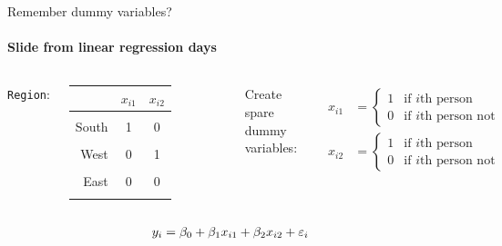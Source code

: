 \documentclass[aspectratio=169,dvipsnames]{beamer}
\newcommand{\InstructorNotes}[1]{\textit{\color{orange}#1}}
\renewcommand{\InstructorNotes}[1]{}
\begin{document}
\begin{frame}[c]{Remember dummy variables?}
\framesubtitle{Slide from linear regression days}

	\begin{columns}
	\centering
	\texttt{Region}:
	
	\qquad
	
	\begin{tabular}{r|cc}
		 & $x_{i1}$ & $x_{i2}$ \\ \hline
		 & \\
		South & {1 } & {0} \\
		\\
		West & {0 } & {1}\\
		\\
		East& {0 } & {0}\\
		&
	\end{tabular}
	
	
	\centering
	Create spare dummy variables:
	
	\begin{align*}
			x_{i1} &=
		\begin{cases}
			1 & \text{if $i$th person from South}\\
			0 & \text{if $i$th person not from South}
		\end{cases}\\
			x_{i2} &=
		\begin{cases}
			1 & \text{if $i$th person from West}\\
			0 & \text{if $i$th person not from West}
		\end{cases}
	\end{align*}
	\InstructorNotes{Baseline is the level we're not using}
	
	\end{columns}
	
	
	\begin{align*}
	y_i &= \beta_0 + \beta_1x_{i1}+ \beta_2x_{i2}+\varepsilon_i
	\end{align*}
	
	\InstructorNotes{Emhpasize that we're NOT doing this. At that point we were using dummy variables in place of an input variable. Next slide we're going to be using a similar idea with output variables}
	\end{frame}
\end{document}
